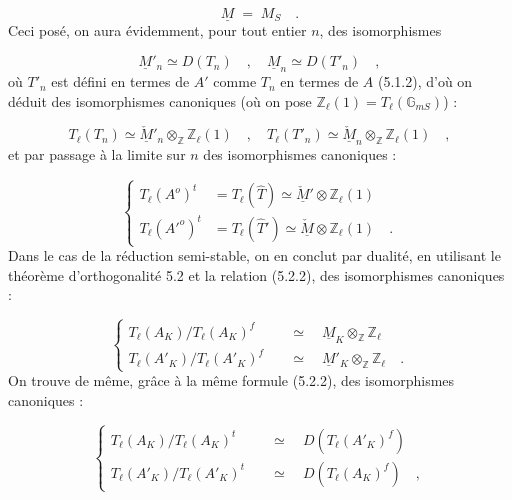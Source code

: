 \begin{equation*}
\underline{M} \;=\; M_S \quad .
\end{equation*}
Ceci posé, on aura évidemment, pour tout entier $n$, des isomorphismes

\begin{equation}\tag{5.5.5}
\underline{M}'_n \simeq D(T_n) \quad , \quad \underline{M}_n \simeq D(T'_n) \quad ,
\end{equation}
où $T'_n$ est défini en termes de $A'$ comme $T_n$ en termes de $A$ (5.1.2), d'où on déduit des isomorphismes canoniques (où on pose $\mathbb{Z}_\ell(1) = T_\ell(\mathbb{G}_{mS})$) :

\begin{equation}\tag{5.5.6}
T_\ell(T_n) \simeq \check{\underline{M}}'_n \otimes_{\mathbb{Z}} \mathbb{Z}_\ell(1) \quad , \quad T_\ell(T'_n) \simeq \check{\underline{M}}_n \otimes_{\mathbb{Z}} \mathbb{Z}_\ell(1) \quad ,
\end{equation}
et par passage à la limite sur $n$ des isomorphismes canoniques :

\begin{equation}\tag{5.5.7}
\left\{\begin{aligned} T_\ell(A^o)^t &= T_\ell(\hat{T}) \simeq \check{\underline{M}}' \otimes \mathbb{Z}_\ell(1)\\[2ex] T_\ell({A'}^o)^t &= T_\ell(\hat{T}') \simeq \check{\underline{M}} \otimes \mathbb{Z}_\ell(1) \quad . \end{aligned}\right.
\end{equation}
Dans le cas de la réduction semi-stable, on en conclut par dualité, en utilisant le théorème d'orthogonalité 5.2 et la relation (5.2.2), des isomorphismes canoniques :

\begin{equation}\tag{5.5.8}
\left\{\begin{aligned} T_\ell(A_K)/T_\ell(A_K)^f \quad &\simeq \quad \underline{M}_K \otimes_{\mathbb{Z}} \mathbb{Z}_\ell\\[2ex] T_\ell(A'_K)/T_\ell(A'_K)^f \quad &\simeq \quad \underline{M}'_K \otimes_{\mathbb{Z}} \mathbb{Z}_\ell \quad . \end{aligned}\right.
\end{equation}
On trouve de même, grâce à la même formule (5.2.2), des isomorphismes canoniques :

\begin{equation}\tag{5.5.9}
\left\{\begin{aligned} T_\ell(A_K)/T_\ell(A_K)^t \quad &\simeq \quad D(T_\ell(A'_K)^f)\\[2ex] T_\ell(A'_K)/T_\ell(A'_K)^t \quad &\simeq \quad D(T_\ell(A_K)^f) \quad , \end{aligned}\right.
\end{equation}

